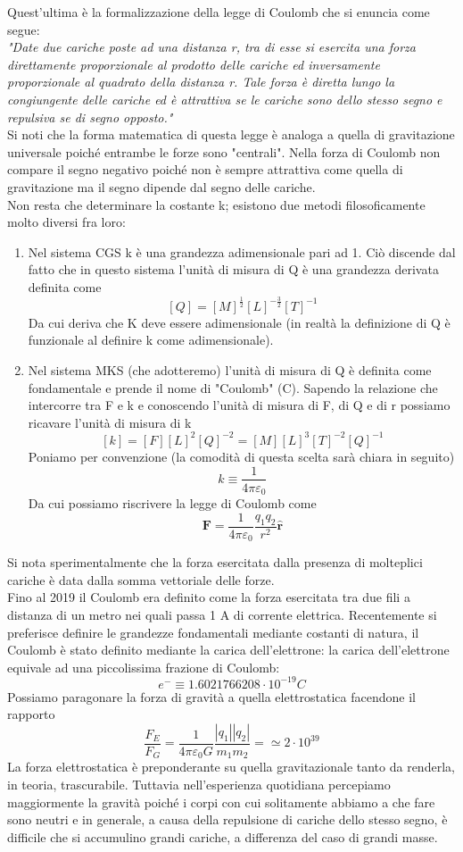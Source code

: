 \documentclass[10pt,a4paper]{article}
\begin{document}
Quest'ultima è la formalizzazione della legge di Coulomb che si enuncia come segue:\\
\textit{"Date due cariche poste ad una distanza r, tra di esse si esercita una forza direttamente proporzionale al prodotto delle cariche ed inversamente proporzionale al quadrato della distanza r. Tale forza è diretta lungo la congiungente delle cariche ed è attrattiva se le cariche sono dello stesso segno e repulsiva se di segno opposto."}\\
Si noti che la forma matematica di questa legge è analoga a quella di gravitazione universale poiché entrambe le forze sono "centrali". Nella forza di Coulomb non compare il segno negativo poiché non è sempre attrattiva come quella di gravitazione ma il segno dipende dal segno delle cariche.\\
Non resta che determinare la costante k; esistono due metodi filosoficamente molto diversi fra loro:
\begin{enumerate}
	\item Nel sistema CGS  k è una grandezza adimensionale pari ad 1. Ciò discende dal fatto che in questo sistema l'unità di misura di Q è una grandezza derivata definita come
	\[[Q] = [M]^{\frac{1}{2}}[L]^{-\frac{3}{2}}[T]^{-1}\]
	Da cui deriva che K deve essere adimensionale (in realtà la definizione di Q è funzionale al definire k come adimensionale).
	\item Nel sistema MKS (che adotteremo) l'unità di misura di Q è definita come fondamentale e prende il nome di "Coulomb" (C). Sapendo la relazione che intercorre tra F e k e conoscendo l'unità di misura di F, di Q e di r possiamo ricavare l'unità di misura di k
	\[[k] = [F][L]^2[Q]^{-2} = [M][L]^3[T]^{-2}[Q]^{-1}\]
	Poniamo per convenzione (la comodità di questa scelta sarà chiara in seguito)
	\[k \equiv \frac{1}{4\pi\varepsilon_0}\]
	Da cui possiamo riscrivere la legge di Coulomb come
	\[\mathbf{F} = \frac{1}{4\pi\varepsilon_0}\frac{q_1q_2}{r^2}\hat{\mathbf{r}}\]
\end{enumerate}
Si nota sperimentalmente che la forza esercitata dalla presenza di molteplici cariche è data dalla somma vettoriale delle forze.\\
Fino al 2019 il Coulomb era definito come la forza esercitata tra due fili a distanza di un metro nei quali passa 1 A di corrente elettrica. Recentemente si preferisce definire le grandezze fondamentali mediante costanti di natura, il Coulomb è stato definito mediante la carica dell'elettrone: la carica dell'elettrone equivale ad una piccolissima frazione di Coulomb: 
\[e^- \equiv 1.6021766208\cdot10^{-19} C\]
Possiamo paragonare la forza di gravità a quella elettrostatica facendone il rapporto
\[\frac{F_E}{F_G} = \frac{1}{4\pi\varepsilon_0 G}\frac{|q_1||q_2|}{m_1m_2}=\simeq 2\cdot10^{39}\]
La forza elettrostatica è preponderante su quella gravitazionale tanto da renderla, in teoria, trascurabile. Tuttavia nell'esperienza quotidiana percepiamo maggiormente la gravità poiché i corpi con cui solitamente abbiamo a che fare sono neutri e in generale, a causa della repulsione di cariche dello stesso segno, è difficile che si accumulino grandi cariche, a differenza del caso di grandi masse.
\end{document}
